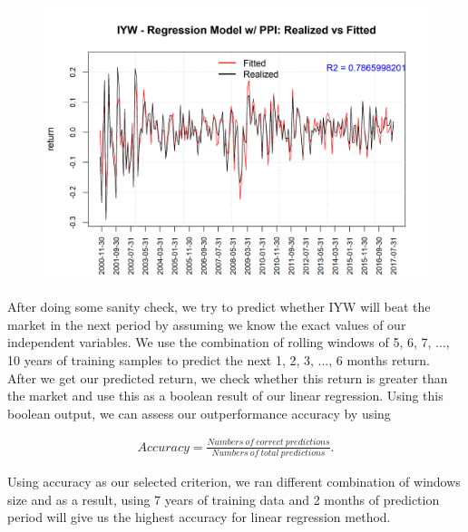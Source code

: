 \documentclass[12pt]{amsart}
\begin{document}
\begin{figure}[htb]
	\includegraphics[scale=0.8]{IYW_linear_reg_withPPI}
\end{figure}

After doing some sanity check, we try to predict whether IYW will beat the market in the next period by assuming we know the exact values of our independent variables. We use the combination of rolling windows of 5, 6, 7, ..., 10 years of training samples to predict the next 1, 2, 3, ..., 6 months return. \\
After we get our predicted return, we check whether this return is greater than the market and use this as a boolean result of our linear regression. Using this boolean output, we can assess our outperformance accuracy by using
 
\begin{align*}
Accuracy = \frac{Numbers\ of\ correct\ predictions}{Numbers\ of\ total\ predictions}.
\end{align*}

Using accuracy as our selected criterion, we ran different combination of windows size and as a result, using 7 years of training data and 2 months of prediction period will give us the highest accuracy for linear regression method.

\newpage
\end{document}
